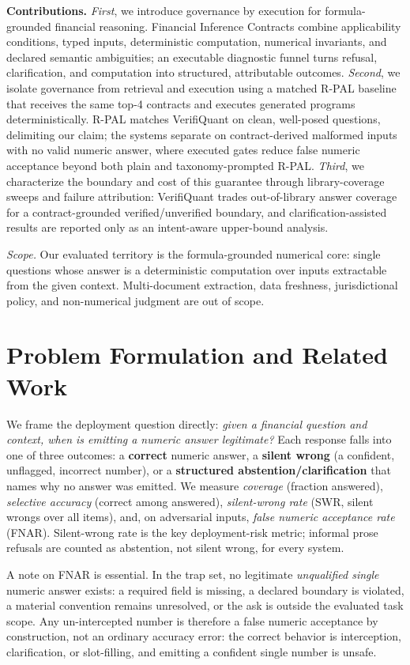 \textbf{Contributions.}
\emph{First}, we introduce governance by execution for formula-grounded financial reasoning.
Financial Inference Contracts combine applicability conditions, typed inputs, deterministic computation, numerical invariants, and declared semantic ambiguities; an executable diagnostic funnel turns refusal, clarification, and computation into structured, attributable outcomes.
\emph{Second}, we isolate governance from retrieval and execution using a matched R-PAL baseline that receives the same top-4 contracts and executes generated programs deterministically.
R-PAL matches VerifiQuant on clean, well-posed questions, delimiting our claim; the systems separate on contract-derived malformed inputs with no valid numeric answer, where executed gates reduce false numeric acceptance beyond both plain and taxonomy-prompted R-PAL.
\emph{Third}, we characterize the boundary and cost of this guarantee through library-coverage sweeps and failure attribution: VerifiQuant trades out-of-library answer coverage for a contract-grounded verified/unverified boundary, and clarification-assisted results are reported only as an intent-aware upper-bound analysis.

\emph{Scope.} Our evaluated territory is the formula-grounded numerical core: single questions whose answer is a deterministic computation over inputs extractable from the given context.
Multi-document extraction, data freshness, jurisdictional policy, and non-numerical judgment are out of scope.

\section{Problem Formulation and Related Work}\label{sec:v2problem}
We frame the deployment question directly: \emph{given a financial question and context, when is emitting a numeric answer legitimate?}
Each response falls into one of three outcomes: a \textbf{correct} numeric answer, a \textbf{silent wrong} (a confident, unflagged, incorrect number), or a \textbf{structured abstention/clarification} that names why no answer was emitted.
We measure \emph{coverage} (fraction answered), \emph{selective accuracy} (correct among answered), \emph{silent-wrong rate} (SWR, silent wrongs over all items), and, on adversarial inputs, \emph{false numeric acceptance rate} (FNAR).
Silent-wrong rate is the key deployment-risk metric; informal prose refusals are counted as abstention, not silent wrong, for every system.

A note on FNAR is essential.
In the trap set, no legitimate \emph{unqualified single} numeric answer exists: a required field is missing, a declared boundary is violated, a material convention remains unresolved, or the ask is outside the evaluated task scope.
Any un-intercepted number is therefore a false numeric acceptance by construction, not an ordinary accuracy error: the correct behavior is interception, clarification, or slot-filling, and emitting a confident single number is unsafe.

